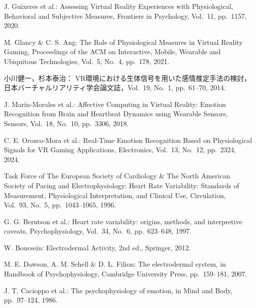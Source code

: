 \documentclass[a4paper]{jarticle}
\begin{document}

\balance


\begin{thebibliography}{12}

J. Guixeres et al.: 
Assessing Virtual Reality Experiences with Physiological, Behavioral and Subjective Measures,
Frontiers in Psychology, Vol.~11, pp.~1157, 2020.

M. Glancy \& C. S. Ang: 
The Role of Physiological Measures in Virtual Reality Gaming,
Proceedings of the ACM on Interactive, Mobile, Wearable and Ubiquitous Technologies, Vol.~5, No.~4, pp.~178, 2021.


小川健一，杉本泰治：
VR環境における生体信号を用いた感情推定手法の検討，
日本バーチャルリアリティ学会論文誌，Vol.~19, No.~1, pp.~61--70, 2014.

J. Marín‑Morales et al.: 
Affective Computing in Virtual Reality: Emotion Recognition from Brain and Heartbeat Dynamics using Wearable Sensors,
Sensors, Vol.~18, No.~10, pp.~3306, 2018.

C. E. Orozco‑Mora et al.: 
Real-Time Emotion Recognition Based on Physiological Signals for VR Gaming Applications,
Electronics, Vol.~13, No.~12, pp.~2324, 2024.

Task Force of The European Society of Cardiology \& The North American Society of Pacing and Electrophysiology: 
Heart Rate Variability: Standards of Measurement, Physiological Interpretation, and Clinical Use,
Circulation, Vol.~93, No.~5, pp.~1043--1065, 1996.

G. G. Berntson et al.: 
Heart rate variability: origins, methods, and interpretive caveats,
Psychophysiology, Vol.~34, No.~6, pp.~623--648, 1997.

W. Boucsein: 
Electrodermal Activity, 2nd ed., 
Springer, 2012.

M. E. Dawson, A. M. Schell \& D. L. Filion: 
The electrodermal system, 
in Handbook of Psychophysiology, Cambridge University Press, pp.~159--181, 2007.

J. T. Cacioppo et al.: 
The psychophysiology of emotion,
in Mind and Body, pp.~97--124, 1986.


\end{thebibliography}
\end{document}
